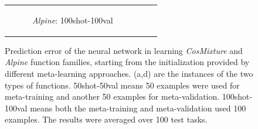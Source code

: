 \begin{figure}[t]
\begin{tabular}[c]{ccc}
\begin{subfigure}[t]{0.32\textwidth}
			\caption{\small \textit{Alpine}: 100shot-100val}
		\end{subfigure} 
	\end{tabular}
	\caption{\small Prediction error of the neural network in learning \textit{CosMixture} and \textit{Alpine} function families, starting from the initialization provided by different meta-learning approaches. (a,d) are the instances of the two types of functions. 50shot-50val means 50 examples were used for meta-training and another 50 examples for meta-validation. 100shot-100val means both the meta-training and meta-validation used  100 examples. The results were averaged over 100 test tasks. } 	
	\label{fig:synthetic}
	\vspace{-0.1in}
\end{figure}

